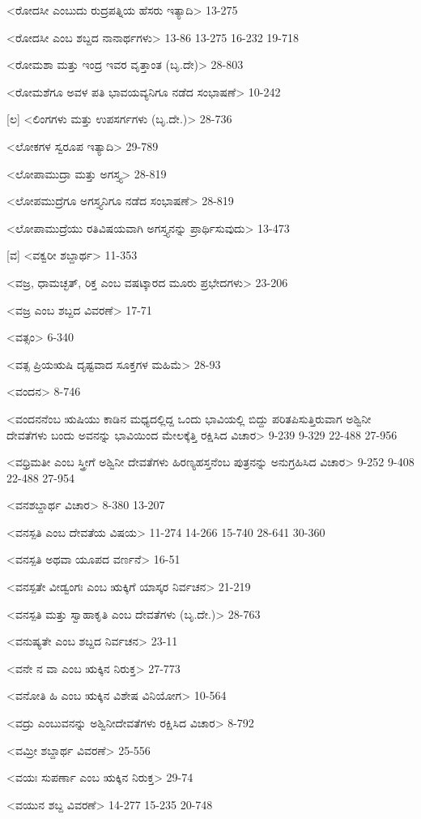 <ರೋದಸೀ ಎಂಬುದು ರುದ್ರಪತ್ನಿಯ ಹೆಸರು ಇತ್ಯಾದಿ>
13-275

<ರೋದಸೀ ಎಂಬ ಶಬ್ದದ ನಾನಾರ್ಥಗಳು>
13-86 
13-275 
16-232
19-718

<ರೋಮಶಾ ಮತ್ತು ಇಂದ್ರ ಇವರ ವೃತ್ತಾಂತ (ಬೃ.ದೇ)>
28-803

<ರೋಮಶೆಗೂ ಅವಳ ಪತಿ ಭಾವಯವ್ಯನಿಗೂ ನಡೆದ ಸಂಭಾಷಣೆ>
10-242

[ಲ]
<ಲಿಂಗಗಳು ಮತ್ತು ಉಪಸರ್ಗಗಳು (ಬೃ.ದೇ.)>
28-736

<ಲೋಕಗಳ ಸ್ವರೂಪ ಇತ್ಯಾದಿ>
29-789

<ಲೋಪಾಮುದ್ರಾ ಮತ್ತು ಅಗಸ್ತ್ಯ>
28-819

<ಲೋಪಮುದ್ರೆಗೂ ಅಗಸ್ತ್ಯನಿಗೂ ನಡೆದ ಸಂಭಾಷಣೆ>
28-819

<ಲೋಪಾಮುದ್ರೆಯು ರತಿವಿಷಯವಾಗಿ ಅಗಸ್ತ್ಯನನ್ನು ಪ್ರಾರ್ಥಿಸುವುದು>
13-473

[ವ]
<ವಕ್ವರೀ ಶಬ್ದಾರ್ಥ>
11-353

<ವಜ್ರ, ಧಾಮಚ್ಛತ್‍, ರಿಕ್ತ ಎಂಬ ವಷಟ್ಕಾರದ ಮೂರು ಪ್ರಭೇದಗಳು>
23-206

<ವಜ್ರ ಎಂಬ ಶಬ್ದದ ವಿವರಣೆ>
17-71

<ವತ್ಸಂ>
6-340

<ವತ್ಸ ಪ್ರಿಯಋಷಿ ದೃಷ್ಟವಾದ ಸೂಕ್ತಗಳ ಮಹಿಮೆ>
28-93

<ವಂದನ>
8-746

<ವಂದನನೆಂಬ ಋಷಿಯು ಕಾಡಿನ ಮಧ್ಯದಲ್ಲಿದ್ದ ಒಂದು ಭಾವಿಯಲ್ಲಿ ಬಿದ್ದು ಪರಿತಪಿಸುತ್ತಿರುವಾಗ ಅಶ್ವಿನೀ ದೇವತೆಗಳು ಬಂದು ಅವನನ್ನು ಭಾವಿಯಿಂದ ಮೇಲಕ್ಕೆತ್ತಿ ರಕ್ಷಿಸಿದ ವಿಚಾರ>
9-239 
9-329
22-488 
27-956

<ವಧ್ರಿಮತೀ ಎಂಬ ಸ್ತ್ರೀಗೆ ಅಶ್ವಿನೀ ದೇವತೆಗಳು ಹಿರಣ್ಯಹಸ್ತನೆಂಬ ಪುತ್ರನನ್ನು ಅನುಗ್ರಹಿಸಿದ ವಿಚಾರ>
9-252 
9-408 
22-488 
27-954

<ವನಶಬ್ದಾರ್ಥ ವಿಚಾರ>
8-380 
13-207

<ವನಸ್ಪತಿ ಎಂಬ ದೇವತೆಯ ವಿಷಯ>
11-274 
14-266 
15-740 
28-641
30-360

<ವನಸ್ಪತಿ ಅಥವಾ ಯೂಪದ ವರ್ಣನೆ>
16-51

<ವನಸ್ಪತೇ ವೀಡ್ವಂಗಃ ಎಂಬ ಋಕ್ಕಿಗೆ ಯಾಸ್ಕರ ನಿರ್ವಚನ>
21-219

<ವನಸ್ಪತಿ ಮತ್ತು ಸ್ವಾಹಾಕೃತಿ ಎಂಬ ದೇವತೆಗಳು (ಬೃ.ದೇ.)>
28-763

<ವನುಷ್ಯತೇ ಎಂಬ ಶಬ್ದದ ನಿರ್ವಚನ>
23-11

<ವನೇ ನ ವಾ ಎಂಬ ಋಕ್ಕಿನ ನಿರುಕ್ತ>
27-773

<ವನೋತಿ ಹಿ ಎಂಬ ಋಕ್ಕಿನ ವಿಶೇಷ ವಿನಿಯೋಗ>
10-564

<ವದ್ರು ಎಂಬುವನನ್ನು ಅಶ್ವಿನೀದೇವತೆಗಳು ರಕ್ಷಿಸಿದ ವಿಚಾರ>
8-792

<ವಮ್ರೀ ಶಬ್ದಾರ್ಥ ವಿವರಣೆ>
25-556

<ವಯಃ ಸುಪರ್ಣಾ ಎಂಬ ಋಕ್ಕಿನ ನಿರುಕ್ತ>
29-74

<ವಯುನ ಶಬ್ದ ವಿವರಣೆ>
14-277 
15-235
20-748

